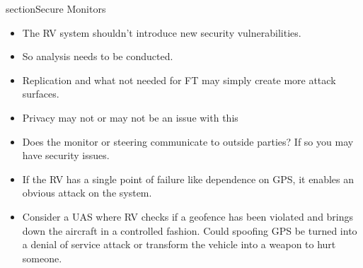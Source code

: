 section{Secure Monitors} \label{sec:secure} 

\noindent{}

\begin{itemize}
\item The RV system shouldn't introduce new security vulnerabilities.
\item So analysis needs to be conducted.
\item Replication and what not needed for FT may simply create more
attack surfaces. 
\item Privacy may not or may not be an issue with this  
\item Does the monitor or steering communicate to outside parties? If
so you may have security issues. 
\item If the RV has a single point of failure like dependence on GPS,
it enables an obvious attack on the system. 
\item Consider a UAS where RV checks if a geofence has been violated
and brings down the aircraft in a controlled fashion. Could spoofing
GPS be turned into a denial of service attack or transform the vehicle
into a weapon to hurt someone. 
\end{itemize}